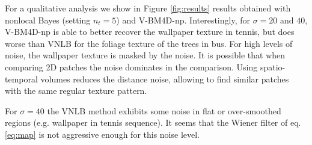 \documentclass{llncs}
\begin{document}
For a qualitative analysis we show in Figure \ref{fig:results} results obtained
with nonlocal Bayes (setting $n_t = 5$) and V-BM4D-np. Interestingly, for $\sigma = 20$
and $40$, V-BM4D-np is able to better recover the wallpaper texture in tennis,
but does worse than VNLB for the foliage texture of the trees in bus. 
For high levels of noise, the wallpaper texture is masked by the noise. 
It is possible that when comparing 2D patches the noise dominates in the
comparison. Using spatio-temporal volumes reduces the distance noise,
allowing to find similar patches with the same regular texture pattern.

For $\sigma = 40$ the VNLB method exhibits some noise in flat or over-smoothed
regions (e.g. wallpaper in tennis sequence). It seems that the
Wiener filter of eq. \eqref{eq:map} is not aggressive enough for this noise level.

% 
\end{document}
